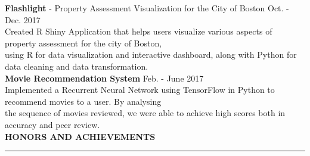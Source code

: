 \documentclass[a4paper]{article}
\newcommand{\myline}{\par
  \kern2pt %
  \hrule height 0.5pt
  \kern2pt %
}
\newcommand{\mybullet}{
	\indent \textbullet \hspace*{2mm}
}
\begin{document}
			\noindent
			\textbf{Flashlight} - Property Assessment Visualization for the City of Boston 
			\hfill Oct. - Dec. 2017 \\
			\mybullet Created R Shiny Application that helps users visualize various aspects of 
			property assessment for the city of  Boston, \\ \hspace*{9mm} using 
			R for data visualization and interactive dashboard, along with Python for data cleaning 
			and data transformation. \\
			
			\noindent
			\textbf{Movie Recommendation System} \hfill Feb. - June 2017\\
			\mybullet Implemented a Recurrent Neural Network using TensorFlow in Python to recommend 
      movies to a user. By analysing \\ \hspace*{9mm} the sequence of movies reviewed, we were 
      able to achieve high scores both in accuracy and peer review. \\ 

	
		
	
	\noindent
	{\large \textbf{HONORS AND ACHIEVEMENTS}}
	\myline 
	\smallskip
\end{document}
